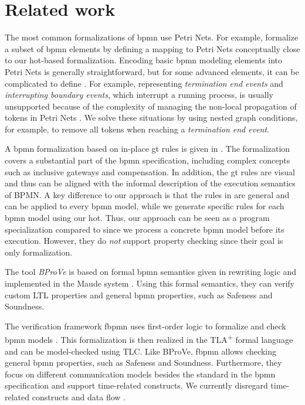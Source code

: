 \documentclass{lmcs} %
\theoremstyle{plain}\newtheorem{satz}[thm]{Satz} %
\begin{document}
\section{Related work} \label{sec:relatedWork}
The most common formalizations of \gls*{bpmn} use Petri Nets.
For example, \cite{dijkmanSemanticsAnalysisBusiness2008} formalize a subset of \gls*{bpmn} elements by defining a mapping to Petri Nets conceptually close to our \gls*{hot}-based formalization.
Encoding basic \gls*{bpmn} modeling elements into Petri Nets is generally straightforward, but for some advanced elements, it can be complicated to define \cite{hofstedeWorkflowPatternsExpressive2002}.
For example, representing \textit{termination end events} and \textit{interrupting boundary events}, which interrupt a running process, is usually unsupported because of the complexity of managing the non-local propagation of tokens in Petri Nets \cite{corradiniFormalApproachAnalysis2021}.
We solve these situations by using nested graph conditions, for example, to remove all tokens when reaching a \textit{termination end event}.

A \gls*{bpmn} formalization based on in-place \gls*{gt} rules is given in \cite{vangorpVisualTokenbasedFormalization2013}.
The formalization covers a substantial part of the \gls*{bpmn} specification, including complex concepts such as inclusive gateways and compensation.
In addition, the \gls*{gt} rules are visual and thus can be aligned with the informal description of the execution semantics of BPMN.
A key difference to our approach is that the rules in \cite{vangorpVisualTokenbasedFormalization2013} are general and can be applied to every \gls*{bpmn} model, while we generate specific rules for each \gls*{bpmn} model using our \gls*{hot}.
Thus, our approach can be seen as a program specialization compared to \cite{vangorpVisualTokenbasedFormalization2013} since we process a concrete \gls*{bpmn} model before its execution.
However, they do \textit{not} support property checking since their goal is only formalization.

The tool \textit{BProVe} is based on formal \gls*{bpmn} semantics given in rewriting logic and implemented in the Maude system \cite{corradiniFormalApproachAnalysis2021}.
Using this formal semantics, they can verify custom LTL properties and general \gls*{bpmn} properties, such as Safeness and Soundness.

The verification framework \textsf{fbpmn} uses first-order logic to formalize and check \gls*{bpmn} models \cite{houhouFirstOrderLogicVerification2022}.
This formalization is then realized in the TLA\textsuperscript{+} formal language and can be model-checked using TLC.
Like BProVe, \textsf{fbpmn} allows checking general \gls*{bpmn} properties, such as Safeness and Soundness.
Furthermore, they focus on different communication models besides the standard in the \gls*{bpmn} specification and support time-related constructs.
We currently disregard time-related constructs \cite{duranVerifyingTimedBPMN2017,houhouFirstOrderLogicVerification2022} and data flow \cite{corradiniFormalisingAnimatingMultiple2022,el-saberCMMICMComplianceChecking2015}.
\end{document}
